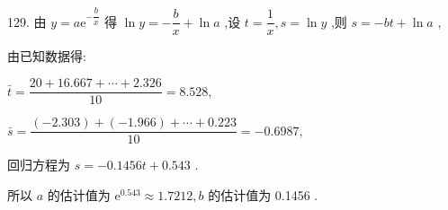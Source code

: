 129. 由 $y = a{\mathrm{e}}^{-\dfrac{b}{x}}$ 得 $\ln y =  - \dfrac{b}{x} + \ln a$ ,设 $t = \dfrac{1}{x},s = \ln y$ ,则 $s =  - {bt} + \ln a$ ,

由已知数据得:

\begin{center}
\end{center}

$\bar{t} = \dfrac{{20} + {16.667} + \cdots  + {2.326}}{10} = {8.528},$

$\bar{s} = \dfrac{\left( {-{2.303}}\right)  + \left( {-{1.966}}\right)  + \cdots  + {0.223}}{10} =  - {0.6987},$

回归方程为 $s =  - {0.1456t} + {0.543}$ .

所以 $a$ 的估计值为 ${\mathrm{e}}^{0.543} \approx  {1.7212},b$ 的估计值为 0.1456 .
